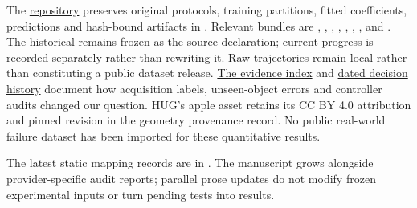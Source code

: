 \documentclass[10pt,letterpaper]{article}
\newcommand{\projecturl}{https://github.com/nilakarthikesan/grasp-failure-recovery}
\begin{document}
The \href{\projecturl}{repository} preserves original protocols, training
partitions, fitted coefficients, predictions and hash-bound artifacts in
. Relevant bundles are
, ,
, ,
, ,
,  and
.
The historical  remains frozen as the source
declaration; current progress is recorded separately rather than rewriting it.
Raw trajectories remain local rather than constituting a public dataset release.
\href{../PAPER_PROGRESS.md}{The evidence index} and
\href{../RESEARCH_DECISIONS.md}{dated decision history} document how acquisition
labels, unseen-object errors and controller audits changed our question.
HUG's apple asset retains its CC BY 4.0 attribution and pinned revision in the
geometry provenance record. No public real-world failure dataset has been
imported for these quantitative results.

The latest static mapping records are in .
The manuscript grows alongside provider-specific audit reports; parallel prose
updates do not modify frozen experimental inputs or turn pending tests into results.
\end{document}
